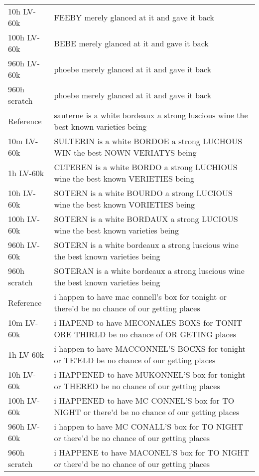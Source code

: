 \documentclass{article}
\newcommand{\voxsz}{LV-60k}
\begin{document}
\begin{table}
{\begin{tabular}{l|l}
10h \voxsz{} & FEEBY  merely glanced at it and gave it back \\
100h \voxsz{} & BEBE   merely glanced at it and gave it back \\
960h \voxsz{} & phoebe merely glanced at it and gave it back \\
960h scratch & phoebe merely glanced at it and gave it back \\
\midrule
Reference & sauterne is a white bordeaux a strong luscious wine the best known varieties being \\
10m \voxsz{} & SULTERIN is a white BORDOE   a strong LUCHOUS  WIN  the best NOWN  VERIATYS  being \\
1h \voxsz{} & CLTEREN  is a white BORDO    a strong LUCHIOUS wine the best known VERIETIES being \\
10h \voxsz{} & SOTERN   is a white BOURDO   a strong LUCIOUS  wine the best known VORIETIES being \\
100h \voxsz{} & SOTERN   is a white BORDAUX  a strong LUCIOUS  wine the best known varieties being \\
960h \voxsz{} & SOTERN   is a white bordeaux a strong luscious wine the best known varieties being \\
960h scratch & SOTERAN  is a white bordeaux a strong luscious wine the best known varieties being \\
\midrule
Reference & i happen to have mac connell's box for tonight or there'd be no chance of our getting places \\
10m \voxsz{} & i HAPEND to have MECONALES BOXS for TONIT ORE THIRLD  be no chance of OR  GETING  places \\
1h \voxsz{} & i happen to have MACCONNEL'S BOCXS for tonight or TE'ELD  be no chance of our getting places \\
10h \voxsz{} & i HAPPENED to have MUKONNEL'S box for tonight or THERED  be no chance of our getting places \\
100h \voxsz{} & i HAPPENED to have MC  CONNEL'S  box for TO NIGHT or there'd be no chance of our getting places \\
960h \voxsz{} & i happen to have MC  CONALL'S  box for TO NIGHT   or there'd be no chance of our getting places \\
960h scratch & i HAPPENE to have MACONEL'S box for TO NIGHT   or there'd be no chance of our getting places \\
\bottomrule
\end{tabular}}
\end{table}
\end{document}
